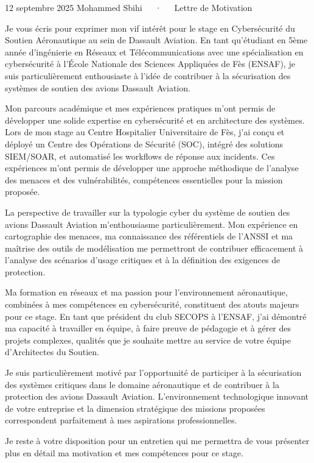 \documentclass[11pt, a4paper]{../../awesome-cv}
\begin{document}
\makecvheader[R]

\makecvfooter
{12 septembre 2025}
{Mohammed Sbihi~~~·~~~Lettre de Motivation}
{}

\makelettertitle

\begin{cvletter}

    Je vous écris pour exprimer mon vif intérêt pour le stage en Cybersécurité du Soutien Aéronautique au sein de Dassault Aviation. En tant qu'étudiant en 5ème année d'ingénierie en Réseaux et Télécommunications avec une spécialisation en cybersécurité à l'École Nationale des Sciences Appliquées de Fès (ENSAF), je suis particulièrement enthousiaste à l'idée de contribuer à la sécurisation des systèmes de soutien des avions Dassault Aviation.

    Mon parcours académique et mes expériences pratiques m'ont permis de développer une solide expertise en cybersécurité et en architecture des systèmes. Lors de mon stage au Centre Hospitalier Universitaire de Fès, j'ai conçu et déployé un Centre des Opérations de Sécurité (SOC), intégré des solutions SIEM/SOAR, et automatisé les workflows de réponse aux incidents. Ces expériences m'ont permis de développer une approche méthodique de l'analyse des menaces et des vulnérabilités, compétences essentielles pour la mission proposée.

    La perspective de travailler sur la typologie cyber du système de soutien des avions Dassault Aviation m'enthousiasme particulièrement. Mon expérience en cartographie des menaces, ma connaissance des référentiels de l'ANSSI et ma maîtrise des outils de modélisation me permettront de contribuer efficacement à l'analyse des scénarios d'usage critiques et à la définition des exigences de protection.

    Ma formation en réseaux et ma passion pour l'environnement aéronautique, combinées à mes compétences en cybersécurité, constituent des atouts majeurs pour ce stage. En tant que président du club SECOPS à l'ENSAF, j'ai démontré ma capacité à travailler en équipe, à faire preuve de pédagogie et à gérer des projets complexes, qualités que je souhaite mettre au service de votre équipe d'Architectes du Soutien.

    Je suis particulièrement motivé par l'opportunité de participer à la sécurisation des systèmes critiques dans le domaine aéronautique et de contribuer à la protection des avions Dassault Aviation. L'environnement technologique innovant de votre entreprise et la dimension stratégique des missions proposées correspondent parfaitement à mes aspirations professionnelles.

    Je reste à votre disposition pour un entretien qui me permettra de vous présenter plus en détail ma motivation et mes compétences pour ce stage.

\end{cvletter}

\makeletterclosing
\end{document}
